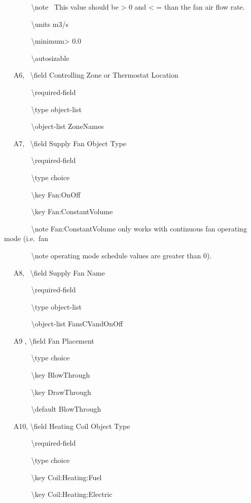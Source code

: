 ~~~~~~~ \textbackslash{}note~ This value should be \textgreater{} 0 and \textless{} = than the fan air flow rate.

~~~~~~~ \textbackslash{}units m3/s

~~~~~~~ \textbackslash{}minimum\textgreater{} 0.0

~~~~~~~ \textbackslash{}autosizable

~~ A6,~ \textbackslash{}field Controlling Zone or Thermostat Location

~~~~~~~ \textbackslash{}required-field

~~~~~~~ \textbackslash{}type object-list

~~~~~~~ \textbackslash{}object-list ZoneNames

~~ A7,~ \textbackslash{}field Supply Fan Object Type

~~~~~~~ \textbackslash{}required-field

~~~~~~~ \textbackslash{}type choice

~~~~~~~ \textbackslash{}key Fan:OnOff

~~~~~~~ \textbackslash{}key Fan:ConstantVolume

~~~~~~~ \textbackslash{}note Fan:ConstantVolume only works with continuous fan operating mode (i.e.~fan

~~~~~~~ \textbackslash{}note operating mode schedule values are greater than 0).

~~ A8,~ \textbackslash{}field Supply Fan Name

~~~~~~~ \textbackslash{}required-field

~~~~~~~ \textbackslash{}type object-list

~~~~~~~ \textbackslash{}object-list FansCVandOnOff

~~ A9 , \textbackslash{}field Fan Placement

~~~~~~~ \textbackslash{}type choice

~~~~~~~ \textbackslash{}key BlowThrough

~~~~~~~ \textbackslash{}key DrawThrough

~~~~~~~ \textbackslash{}default BlowThrough

~~ A10, \textbackslash{}field Heating Coil Object Type

~~~~~~~ \textbackslash{}required-field

~~~~~~~ \textbackslash{}type choice

~~~~~~~ \textbackslash{}key Coil:Heating:Fuel

~~~~~~~ \textbackslash{}key Coil:Heating:Electric

